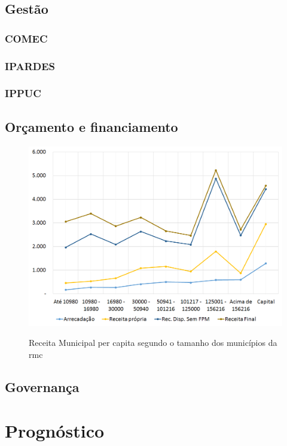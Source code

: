 	\section{Gestão}
	
	\subsection{COMEC}
	
	\subsection{IPARDES}
	
	\subsection{IPPUC}
	
	\section{Orçamento e financiamento}
		
	\begin{figure}
		\centering
		\caption{Receita Municipal per capita segundo o tamanho dos municípios da \gls{rmc}}
		\includegraphics[width=1.0\linewidth]{img/orcamento_A}
		\label{fig:orcamento}
	\end{figure}
	
	\section{Governança}
	
	\chapter{Prognóstico}
	

